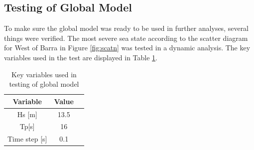 \subsection{Testing of Global Model}
To make sure the global model was ready to be used in further analyses, several things were verified.  The most severe sea state according to the scatter diagram for West of Barra in Figure \ref{fig:scatn} was tested in a dynamic analysis. The key variables used in the test are displayed in Table \ref{table:testglob}.

\begin{table} [H]
\centering
\begin{tabular}{ |c|c|c|}
\hline
Variable & Value \\
 \hline
 \hline
Hs [m] & 13.5\\
Tp[s] & 16 \\
Time step [s] & 0.1 \\
 \hline
\end{tabular}
\caption{Key variables used in testing of global model}
\label{table:testglob}
\end{table}


